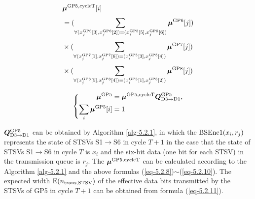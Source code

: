 \documentclass[lettersize,journal]{IEEEtran}
\begin{document}
\begin{equation}
	\begin{aligned}
		&\boldsymbol{\mu}^{\rm GP5, cycleT}[i] \\
		&=( \sum_{\forall (x_j^{\rm GP6}[3],x_j^{\rm GP6}[2]) = (x_i^{\rm GP5}[5],x_j^{\rm GP5}[6])}^{} \boldsymbol{\mu}^{\rm GP6}[j] ) \\	
		&\times ( \sum_{\forall (x_j^{\rm GP7}[1],x_j^{\rm GP7}[6]) = (x_i^{\rm GP5}[3],x_j^{\rm GP5}[4])}^{} \boldsymbol{\mu}^{\rm GP7}[j] ) \\	
		&\times ( \sum_{\forall (x_j^{\rm GP8}[5],x_j^{\rm GP8}[4]) = (x_i^{\rm GP5}[1],x_j^{\rm GP5}[2])}^{} \boldsymbol{\mu}^{\rm GP8}[j] ) \\		
	\end{aligned}
	\label{eq-5.2.9}
\end{equation}


\begin{equation}
	\left\{
	\begin{aligned}
		\boldsymbol{\mu}^{\rm GP5} &= \boldsymbol{\mu}^{\rm GP5,cycleT}\boldsymbol{Q}_{\rm D3\to D1}^{\rm GP5},\\
		\sum_i \boldsymbol{\mu}^{\rm GP5}[i] &= 1
	\end{aligned}
	\right.
	\label{eq-5.2.10}
\end{equation}

$\boldsymbol{Q}_{\rm D3\to D1}^{\rm GP5}$ can be obtained by Algorithm \ref{alg-5.2.1}, in which the ${\rm BSEnc1}(x_i,r_j)$ represents the state of STSVs S1$\to$S6 in cycle $T+1$ in the case that the state of STSVs S1$\to$S6 in cycle $T$ is $x_i$ and the six-bit data (one bit for each STSV) in the transmission queue is $r_j$. The $\boldsymbol{\mu}^{\rm GP5, cycleT}$ can be calculated according to the Algorithm \ref{alg-5.2.1} and the above formulas (\ref{eq-5.2.8})$\sim$(\ref{eq-5.2.10}). The expected width ${\rm E}(n_{\rm trans,STSV})$ of the effective data bits transmitted by the STSVs of GP5 in cycle $T+1$ can be obtained from formula (\ref{eq-5.2.11}).
\end{document}
